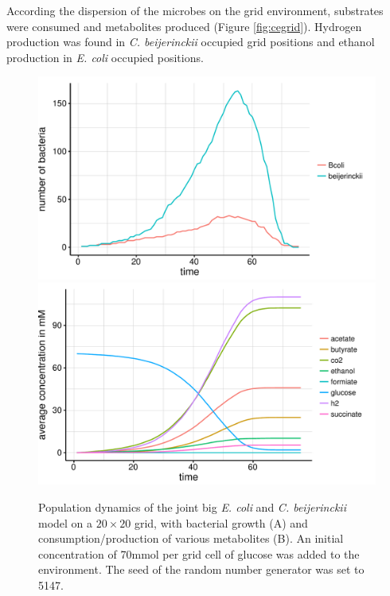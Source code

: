 According the dispersion of the microbes on the grid environment, substrates were consumed and metabolites produced (Figure \hyperref[fig:cegrid]{\ref{fig:cegrid}}). Hydrogen production was found in \textit{C. beijerinckii} occupied grid positions and ethanol production in \textit{E. coli} occupied positions.
\begin{figure}[h!]
  \centering
    \includegraphics[scale=0.45]{../results/img/ecoli_beijerinckii_20x20_seed5147_growth.pdf}
    \includegraphics[scale=0.45]{../results/img/ecoli_beijerinckii_20x20_seed5147_subs.pdf}
  \caption{Population dynamics of the joint big \emph{E. coli} and \emph{C. beijerinckii} model on a $20\times20$ grid, with bacterial growth (A) and consumption/production of various metabolites (B). An initial concentration of 70\;mmol per grid cell of glucose was added to the environment. The seed of the random number generator was set to 5147.}
  \label{fig:cesg}
\end{figure}
